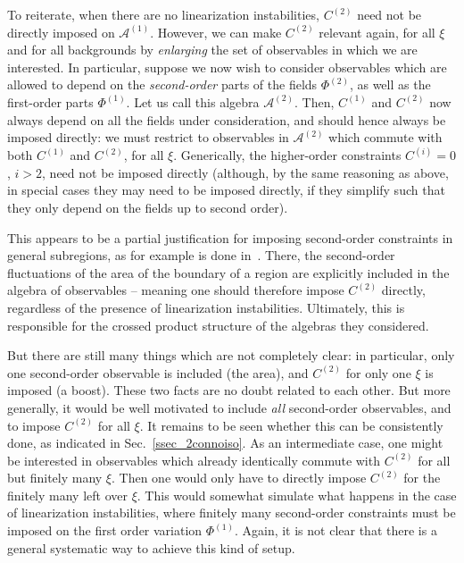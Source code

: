\documentclass[]{jkpaper}
\theoremstyle{plain}
\theoremstyle{definition}
\begin{document}
To reiterate, when there are no linearization instabilities, $C^{(2)}$ need not be directly imposed on $\mathcal{A}^{(1)}$. However, we can make $C^{(2)}$ relevant again, for all $\xi$ and for all backgrounds by \emph{enlarging} the set of observables in which we are interested. In particular, suppose we now wish to consider observables which are allowed to depend on the \emph{second-order} parts of the fields $\Phi^{(2)}$, as well as the first-order parts $\Phi^{(1)}$. Let us call this algebra $\mathcal{A}^{(2)}$. Then, $C^{(1)}$ and $C^{(2)}$ now always depend on all the fields under consideration, and should hence always be imposed directly: we must restrict to observables in $\mathcal{A}^{(2)}$ which commute with both $C^{(1)}$ and $C^{(2)}$, for all $\xi$. Generically, the higher-order constraints $C^{(i)}=0$, $i>2$, need not be imposed directly (although, by the same reasoning as above, in special cases they may need to be imposed directly, if they simplify such that they only depend on the fields up to second order).

This appears to be a partial justification for imposing second-order constraints in general subregions, as for example is done in~\cite{Jensen:2023yxy,Faulkner:2024gst,Kudler-Flam:2023qfl,KirklinGSL}. There, the second-order fluctuations of the area of the boundary of a region are explicitly included in the algebra of observables -- meaning one should therefore impose $C^{(2)}$ directly, regardless of the presence of linearization instabilities. Ultimately, this is responsible for the crossed product structure of the algebras they considered. 

But there are still many things which are not completely clear: in particular, only one second-order observable is included (the area), and $C^{(2)}$ for only one $\xi$ is imposed (a boost). These two facts are no doubt related to each other. But more generally, it would be well motivated to include \emph{all} second-order observables, and to impose $C^{(2)}$ for all $\xi$. It remains to be seen whether this can be consistently done, as indicated in Sec.~\ref{ssec_2connoiso}. As an intermediate case, one might be interested in observables which already identically commute with $C^{(2)}$ for all but finitely many $\xi$. Then one would only have to directly impose $C^{(2)}$ for the finitely many left over $\xi$. This would somewhat simulate what happens in the case of linearization instabilities, where finitely many second-order constraints must be imposed on the first order variation $\Phi^{(1)}$. Again, it is not clear that there is a general systematic way to achieve this kind of setup.
\end{document}
